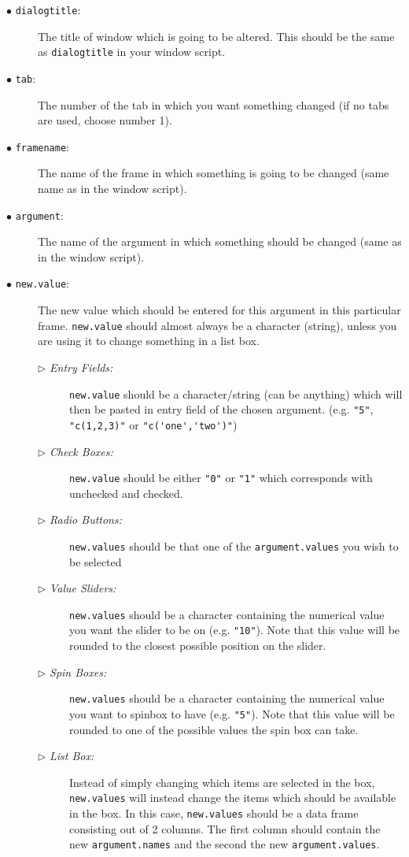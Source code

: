 \documentclass[a4paper]{article}\usepackage[]{graphicx}\usepackage[]{color}
\begin{document}
\begin{description}
  \item[$\bullet$ \texttt{dialogtitle}:] The title of window which is going to
  be altered. This should be the same as \verb|dialogtitle| in your window
  script.
  \item[$\bullet$ \texttt{tab}:] The number of the tab in which you want
  something changed (if no tabs are used, choose number 1).
  \item[$\bullet$ \texttt{framename}:] The name of the frame in which something
  is going to be changed (same name as in the window script).
  \item[$\bullet$ \texttt{argument}:] The name of the argument in which
  something should be changed (same as in the window script).
  \item[$\bullet$ \texttt{new.value}:] The new value which should be entered for
  this argument in this particular frame. \verb|new.value| should almost always
  be a character (string), unless you are using it to change something in a list
  box.
  \begin{description}
    \item[$\triangleright$ {\it Entry Fields:}] \verb|new.value| should be a
    character/string (can be anything) which will then be pasted in entry field
    of the chosen argument. (e.g. \verb|"5"|, \verb|"c(1,2,3)"| or \verb|"c('one','two')"|)
    \item[$\triangleright$ {\it Check Boxes:}] \verb|new.value| should be
    either \verb|"0"| or \verb|"1"| which corresponds with unchecked and
    checked.
    \item[$\triangleright$ {\it Radio Buttons:}] \verb|new.values| should be
    that one of the \verb|argument.values| you wish to be selected
    \item[$\triangleright$ {\it Value Sliders:}] \verb|new.values| should be a
    character containing the numerical value you want the slider to be on (e.g.
    \verb|"10"|). Note that this value will be rounded to the closest possible
    position on the slider.
    \item[$\triangleright$ {\it Spin Boxes:}] \verb|new.values| should be a
    character containing the numerical value you want to spinbox to have (e.g.
    \verb|"5"|). Note that this value will be rounded to one of the possible
    values the spin box can take.
    \item[$\triangleright$ {\it List Box:}] Instead of simply changing which
    items are selected in the box, \verb|new.values| will instead change the
    items which should be available in the box. In this case, \verb|new.values|
    should be a data frame consisting out of 2 columns. The first column should
    contain the new \verb|argument.names| and the second the new \verb|argument.values|.

  \end{description}
\end{description}
\end{document}
